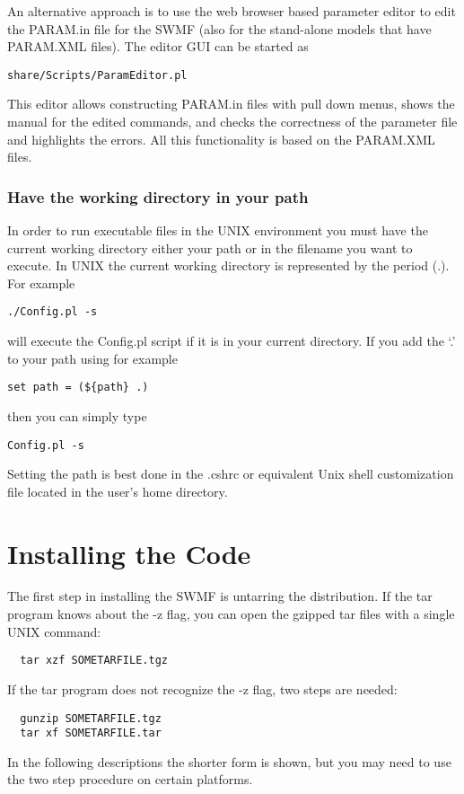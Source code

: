 An alternative approach is to use the web browser based parameter editor 
to edit the PARAM.in file for the SWMF 
(also for the stand-alone models that have PARAM.XML files).
The editor GUI can be started as
\begin{verbatim}
share/Scripts/ParamEditor.pl
\end{verbatim}
This editor allows constructing PARAM.in files with pull down menus, 
shows the manual for the edited commands, and checks the correctness of
the parameter file and highlights the errors. All this functionality 
is based on the PARAM.XML files.

\subsubsection{Have the working directory in your path}

In order to run executable files in the UNIX environment you must have
the current working directory either your path or in the filename you
want to execute. In UNIX the current working directory is represented
by the period (.).  For example
\begin{verbatim} 
./Config.pl -s
\end{verbatim}
will execute the Config.pl script if it is in your current directory.  
If you add the `.' to your path using for example
\begin{verbatim}
set path = (${path} .)
\end{verbatim}
then you can simply type
\begin{verbatim} 
Config.pl -s
\end{verbatim}
Setting the path is best done in the .cshrc or equivalent Unix shell 
customization file located in the user's home directory.

\section{Installing the Code}

The first step in installing the SWMF is untarring the distribution.
If the tar program knows about the -z flag, you can open the gzipped
tar files with a single UNIX command:
\begin{verbatim}
  tar xzf SOMETARFILE.tgz
\end{verbatim}
If the tar program does not recognize the -z flag, two steps are needed:
\begin{verbatim}
  gunzip SOMETARFILE.tgz
  tar xf SOMETARFILE.tar
\end{verbatim}
In the following descriptions the shorter form is shown, but you may
need to use the two step procedure on certain platforms.

